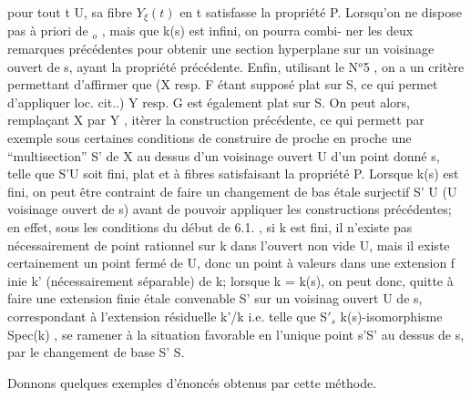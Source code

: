 pour tout t \hand{$\in$}U,  sa fibre $Y_{\xi}(t)$ en  t satisfasse la propriété P.  Lorsqu'on ne
dispose pas à priori de \hand{$\xi$}$_{o}$ ,  mais que k(s) est infini, on pourra combi-%
ner les deux remarques précédentes pour obtenir une section hyperplane
sur un voisinage ouvert de s, ayant la propriété précédente.  Enfin,
utilisant le N$^{o}$5 , on a un critère permettant d'affirmer que (X resp. F étant
supposé plat sur S, ce qui permet d'appliquer loc. cit..)  Y\hand{$_{\xi}$} resp. G\hand{$_{\xi}$} est également
plat sur S. On peut alors, remplaçant X par Y\hand{$_{\xi}$} , itèrer la construction
précédente, ce qui permett par exemple sous certaines conditions de construire de proche en proche une
``multisection'' S' de X au dessus d'un voisinage ouvert U d'un point donné s,
telle que S'\hand{$\longrightarrow$}U soit fini, plat et à fibres satisfaisant la propriété P.
Lorsque k(s) est fini, on peut être contraint de faire un changement de bas%
étale surjectif S'\hand{$\longrightarrow$} U (U voisinage ouvert de s) avant de pouvoir appliquer
les constructions précédentes; en effet, sous les conditions du début de
6.1. , si k est fini, il n'existe pas nécessairement de point rationnel sur
k dans  l'ouvert non vide U, mais 
il existe certainement un point fermé de U, donc un point à valeurs dans
une extension f inie k' (nécessairement séparable) de k; lorsque k = k(s),
on peut donc, quitte à faire une extension finie étale convenable S' sur un voisinag%
ouvert U de  s, correspondant à l'extension résiduelle k'/k
i.e. telle que  S$'_{s}$ \hand{$\xrightarrow{\sim}$}k(s)-isomorphisme Spec(k) , se ramener à la situation favorable 
en l'unique point s'\hand{$\in$}S' au dessus de s, par le changement de base S'\hand{$\to$} S.

Donnons quelques exemples d'énoncés obtenus par cette méthode. 
%

%
%

%

